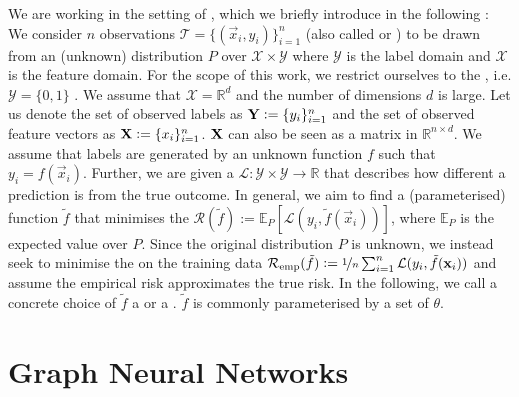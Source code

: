 \documentclass[
	fontsize=10pt, %
	twoside=false, %
	secnumdepth=1, %
  toc=indentunnumbered %
]{kaobook}
\begin{document}
We are working in the setting of , which we
briefly introduce in the following
\cite{vapnik_PrinciplesRiskMinimization_,bronstein_geometric_2021}:
We consider $n$ observations $\mathcal{T} = \{(\vec x_i, y_i)\}_{i=1}^n$ (also
called  or ) to be drawn from an (unknown)
distribution $P$ over $\mathcal{X} \times \mathcal{Y}$ where $\mathcal{Y}$ is
the label domain and $\mathcal{X}$ is the feature domain. For the scope of this
work, we restrict ourselves to the , i.e.
$\mathcal{Y} = \{0,1\}$ . We assume that $\mathcal{X} = \mathbb{R}^d$ and the
number of dimensions $d$ is large. Let us denote the set of
observed  labels as $\mat Y := \{y_i\}_{i=1}^n$ and the set of
observed feature vectors as $\mat X := \{x_i\}_{i=1}^n$. $\mat X$ can also be
seen as a matrix in $\mathbb{R}^{n \times d}$.
%
We assume that labels are generated by an unknown function $f$ such that $y_i
= f(\vec x_i)$.
%
Further, we are given a  $\mathcal{L} :
\mathcal{Y} \times \mathcal{Y} \rightarrow \mathbb{R}$ that describes how
different a prediction is from the true outcome.
%
In general, we aim to find a (parameterised) function $\tilde f$ that minimises
the  $\mathcal{R}(\tilde f) := \mathbb{E}_P\left[ \mathcal{L}(y_i,
    \tilde f(\vec x_i)) \right]$, where $\mathbb{E}_P$ is the expected value
over $P$.
%
Since the original distribution $P$ is unknown, we instead seek to minimise the 
  on the training data
$\mathcal{R}_{\text{emp}}(\tilde f) := \nicefrac{1}{n}
\sum_{i=1}^n \mathcal{L}(y_i, \tilde f(\vec x_i))$ and assume the empirical risk
approximates the true risk.
%
In the following, we call a concrete choice of $\tilde f$ a  or a
. $\tilde f$ is commonly parameterised by a set of 
$\theta$.




\section{Graph Neural Networks}
\label{sec:neural-networks}

\end{document}

